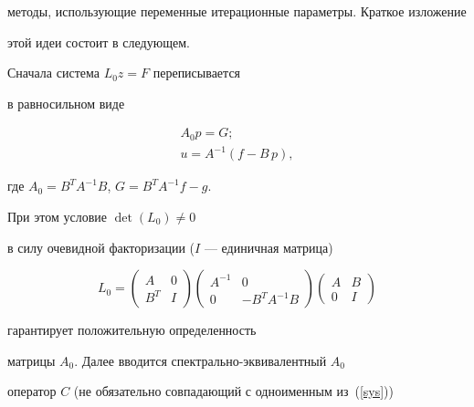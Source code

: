 методы, использующие переменные итерационные параметры. Краткое изложение


этой идеи состоит в следующем.


Сначала система $L_{0}z=F$ переписывается


в равносильном виде


\begin{equation}


\label{sys0}


\begin{array}{c}


A_0  p = G; \\


u = A^{-1} ( f - B\,p ),


\end{array}


\end{equation}


где $A_0=B^T A^{-1} B$, $G = B^T A^{-1} f - g$.


При этом условие $\det(L_{0})\neq 0 $


в силу очевидной факторизации ($I$ --- единичная матрица)


$$


L_{0} =


\begin{pmatrix}


A & 0 \\


B^T & I


\end{pmatrix}


\begin{pmatrix}


A^{-1} & 0 \\


0 & - B^T A^{-1} B


\end{pmatrix}


\begin{pmatrix}


A & B \\


0 & I


\end{pmatrix}


$$


гарантирует положительную определенность


матрицы $A_0$. Далее вводится спектрально-эк\-ви\-ва\-лент\-ный $A_0$


оператор $C$ (не обязательно совпадающий с одноименным из~(\ref{sys}))


